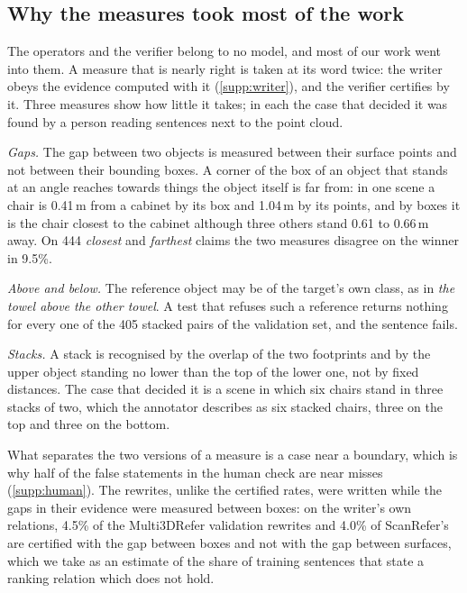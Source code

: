 \subsection{Why the measures took most of the work}
\label{supp:ruler}
The operators and the verifier belong to no model, and most of our work went into them.
A measure that is nearly right is taken at its word twice: the writer obeys the evidence computed with it (\cref{supp:writer}), and the verifier certifies by it.
Three measures show how little it takes; in each the case that decided it was found by a person reading sentences next to the point cloud.

\emph{Gaps.}
The gap between two objects is measured between their surface points and not between their bounding boxes.
A corner of the box of an object that stands at an angle reaches towards things the object itself is far from: in one scene a chair is 0.41\,m from a cabinet by its box and 1.04\,m by its points, and by boxes it is the chair closest to the cabinet although three others stand 0.61 to 0.66\,m away.
On 444 \emph{closest} and \emph{farthest} claims the two measures disagree on the winner in 9.5\%.

\emph{Above and below.}
The reference object may be of the target's own class, as in \emph{the towel above the other towel}.
A test that refuses such a reference returns nothing for every one of the 405 stacked pairs of the validation set, and the sentence fails.

\emph{Stacks.}
A stack is recognised by the overlap of the two footprints and by the upper object standing no lower than the top of the lower one, not by fixed distances.
The case that decided it is a scene in which six chairs stand in three stacks of two, which the annotator describes as six stacked chairs, three on the top and three on the bottom.

What separates the two versions of a measure is a case near a boundary, which is why half of the false statements in the human check are near misses (\cref{supp:human}).
The rewrites, unlike the certified rates, were written while the gaps in their evidence were measured between boxes: on the writer's own relations, 4.5\% of the Multi3DRefer validation rewrites and 4.0\% of ScanRefer's are certified with the gap between boxes and not with the gap between surfaces, which we take as an estimate of the share of training sentences that state a ranking relation which does not hold.
